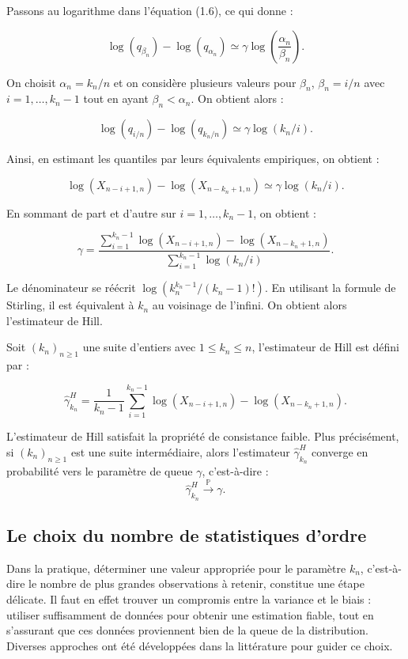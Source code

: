 \documentclass{article}
\theoremstyle{plain}
\theoremstyle{definition}
\theoremstyle{plain}
\begin{document}
Passons au logarithme dans l’équation (1.6), ce qui donne :

\[
\log(q_{\beta_n}) - \log(q_{\alpha_n}) \simeq \gamma \log\left( \frac{\alpha_n}{\beta_n} \right).
\]

On choisit $\alpha_n = k_n/n$ et on considère plusieurs valeurs pour $\beta_n$, $\beta_n = i/n$ avec $i = 1, \ldots, k_n - 1$ tout en ayant $\beta_n < \alpha_n$. On obtient alors :

\[
\log(q_{i/n}) - \log(q_{k_n/n}) \simeq \gamma \log(k_n/i).
\]

Ainsi, en estimant les quantiles par leurs équivalents empiriques, on obtient :

\[
\log(X_{n - i + 1, n}) - \log(X_{n - k_n + 1, n}) \simeq \gamma \log(k_n / i).
\]

En sommant de part et d’autre sur $i = 1, \ldots, k_n - 1$, on obtient :

\[
\gamma = \frac{\displaystyle \sum_{i=1}^{k_n - 1} \log(X_{n - i + 1, n}) - \log(X_{n - k_n + 1, n})}{\displaystyle \sum_{i=1}^{k_n - 1} \log(k_n / i)}.
\]

Le dénominateur se réécrit $\log(k_n^{k_n - 1}/(k_n - 1)!)$. En utilisant la formule de Stirling, il est équivalent à $k_n$ au voisinage de l’infini. On obtient alors l’estimateur de Hill.

Soit $(k_n)_{n \geq 1}$ une suite d'entiers avec $1 \leq k_n \leq n$, l’estimateur de Hill est défini par :

\[
\hat{\gamma}^{H}_{k_n} = \frac{1}{k_n - 1} \sum_{i=1}^{k_n - 1} \log(X_{n - i + 1, n}) - \log(X_{n - k_n + 1, n}).
\]

L’estimateur de Hill satisfait la propriété de consistance faible. Plus précisément, si $(k_n)_{n \geq 1}$ est une suite intermédiaire, alors l’estimateur $\hat{\gamma}^{H}_{k_n}$ converge en probabilité vers le paramètre de queue $\gamma$, c’est-à-dire :
\[
\hat{\gamma}^{H}_{k_n} \xrightarrow{\mathbb{P}} \gamma.
\]


\subsection{Le choix du nombre de statistiques d’ordre}

Dans la pratique, déterminer une valeur appropriée pour le paramètre $k_n$, c’est-à-dire le nombre de plus grandes observations à retenir, constitue une étape délicate. Il faut en effet trouver un compromis entre la variance et le biais : utiliser suffisamment de données pour obtenir une estimation fiable, tout en s’assurant que ces données proviennent bien de la queue de la distribution. Diverses approches ont été développées dans la littérature pour guider ce choix.
\end{document}
